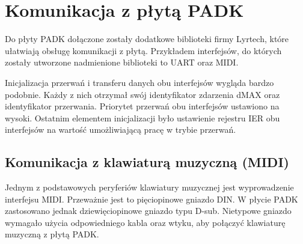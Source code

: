 \section{Komunikacja z płytą PADK}
Do płyty PADK dołączone zostały dodatkowe biblioteki firmy Lyrtech, które ułatwiają obsługę komunikacji z płytą. Przykładem interfejsów, do których zostały utworzone nadmienione biblioteki to UART oraz MIDI.

Inicjalizacja przerwań i transferu danych obu interfejsów wygląda bardzo podobnie. Każdy z nich otrzymał swój identyfikator zdarzenia dMAX oraz identyfikator przerwania. Priorytet przerwań obu interfejsów ustawiono na wysoki. Ostatnim elementem inicjalizacji było ustawienie rejestru IER obu interfejsów na wartość umożliwiającą pracę w trybie przerwań.

\subsection{Komunikacja z klawiaturą muzyczną  (MIDI)}
Jednym z podstawowych peryferiów klawiatury muzycznej jest wyprowadzenie interfejsu MIDI. Przeważnie jest to pięciopinowe gniazdo DIN. W płycie PADK zastosowano jednak dziewięciopinowe gniazdo typu D-sub. Nietypowe gniazdo wymagało użycia odpowiedniego kabla oraz wtyku, aby połączyć klawiaturę muzyczną z płytą PADK.


